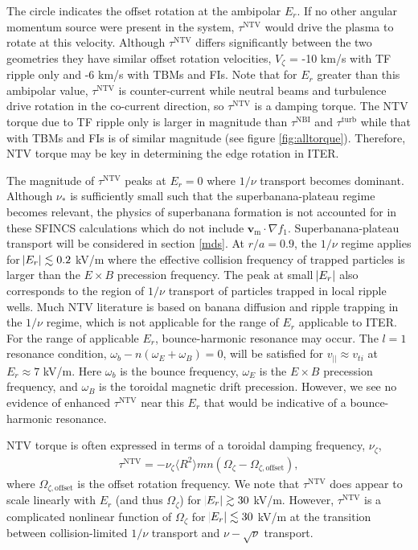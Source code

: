 \documentclass[aip, pop, preprint]{revtex4-1}
\numberwithin{figure}{section}
\numberwithin{equation}{section}
\begin{document}
The circle indicates the offset rotation at the ambipolar $E_r$. If no other angular momentum source were present in the system, $\tau^{\text{NTV}}$ would drive the plasma to rotate at this velocity. Although $\tau^{\text{NTV}}$ differs significantly between the two geometries they have similar offset rotation velocities, $V_{\zeta}$ = -10 km/s with TF ripple only and -6 km/s with TBMs and FIs. Note that for $E_r$ greater than this ambipolar value, $\tau^{\text{NTV}}$ is counter-current while neutral beams and turbulence drive rotation in the co-current direction, so $\tau^{\text{NTV}}$ is a damping torque. The NTV torque due to TF ripple only is larger in magnitude than $\tau^{\text{NBI}}$ and $\tau^{\text{turb}}$ while that with TBMs and FIs is of similar magnitude (see figure \ref{fig:alltorque}). Therefore, NTV torque may be key in determining the edge rotation in ITER. 

The magnitude of $\tau^{\text{NTV}}$ peaks at $E_r = 0$ where $1/\nu$ transport becomes dominant. Although $\nu_*$ is sufficiently small such that the superbanana-plateau regime becomes relevant, the physics of superbanana formation is not accounted for in these SFINCS calculations which do not include $\bm{v}_{\text{m}} \cdot \nabla f_1$. Superbanana-plateau transport will be considered in section \ref{mds}. At $r/a = 0.9$, the $1/\nu$ regime applies for $\abs{E_r} \lesssim 0.2$ kV/m where the effective collision frequency of trapped particles is larger than the $E \times B$ precession frequency. The peak at small $\abs{E_r}$ also corresponds to the region of $1/\nu$ transport of particles trapped in local ripple wells. Much NTV literature is based on banana diffusion and ripple trapping in the $1/\nu$ regime,\cite{Stringer1972, Connor1974} which is not applicable for the range of $E_r$ applicable to ITER. For the range of applicable $E_r$, bounce-harmonic resonance may occur. The $l =1$ resonance condition, $\omega_b - n(\omega_E + \omega_B) = 0$, will be satisfied for $v_{||} \approx v_{ti}$ at $E_r \approx 7$ kV/m. Here $\omega_b$ is the bounce frequency, $\omega_E$ is the $E \times B$ precession frequency, and $\omega_B$ is the toroidal magnetic drift precession.\cite{Park2009} However, we see no evidence of enhanced $\tau^{\text{NTV}}$ near this $E_r$ that would be indicative of a bounce-harmonic resonance.

NTV torque is often expressed in terms of a toroidal damping frequency, $\nu_{\zeta}$,
\begin{gather}
\tau^{\text{NTV}} = - \nu_{\zeta} \langle R^2 \rangle m n ( \Omega_{\zeta} - \Omega_{\zeta, \text{offset}}),
\end{gather}
where $\Omega_{\zeta, \text{offset}}$ is the offset rotation frequency. We note that $\tau^{\text{NTV}}$ does appear to scale linearly with $E_r$ (and thus $\Omega_{\zeta}$) for $\abs{E_r} \gtrsim 30$ kV/m. However, $\tau^{\text{NTV}}$ is a complicated nonlinear function of $\Omega_{\zeta}$ for $\abs{E_r} \lesssim 30$ kV/m at the transition between collision-limited $1/\nu$ transport and $\nu-\sqrt{\nu}$ transport. 
\end{document}
